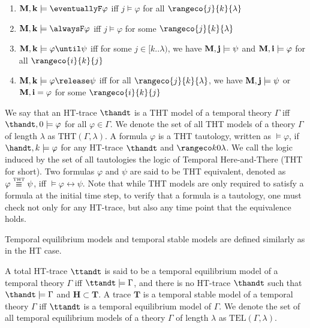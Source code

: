 \begin{definition}
\begin{enumerate}
  \item $\bf{M},k \models \eventuallyF \varphi$ iff $j \models \varphi$ for all $\rangeco{j}{k}{\lambda}$  
  \item $\bf{M},k \models \alwaysF \varphi$ iff $j \models \varphi$ for some $\rangeco{j}{k}{\lambda}$  
  \item $\bf{M}, k \models \varphi \until \psi$ iff for some $j \in[k . . \lambda)$, we have $\bf{M}, j \models \psi$ and $\bf{M}, i \models \varphi$ for all $\rangeco{i}{k}{j}$
  \item $\bf{M}, k \models \varphi \release \psi$ iff for all $\rangeco{j}{k}{\lambda}$, we have $\bf{M}, j \models \psi$ or $\bf{M},
    i=\varphi$ for some $\rangeco{i}{k}{j}$
\end{enumerate}
\end{definition}

We say that an HT-trace $\thandt$ is a THT model of a temporal theory
$\Gamma$ iff $\thandt,0 \models \varphi$ for all $\varphi \in
\Gamma$. We denote the set of all THT models of a theory $\Gamma$ of
length $\lambda$ as $\text{THT}(\Gamma,\lambda)$. A formula $\varphi$
is a THT tautology, written as $\models \varphi$, if
$\handt,k \models \varphi$ for any HT-trace $\thandt$ and
$\kinlambda$. We call the logic induced by the set of all tautologies
the logic of Temporal Here-and-There (THT for short). Two formulas
$\varphi$ and $\psi$ are said to be THT equivalent, denoted as
$\varphi \stackrel{\normalfont\mbox{\tiny THT}}{\equiv} \psi$, iff $\models \varphi \leftrightarrow
\psi$. Note that while THT models are only required to satisfy a
formula at the initial time step, to verify that a formula is a
tautology, one must check not only for any HT-trace, but also any time
point that the equivalence holds.

Temporal equilibrium models and temporal stable models are defined
similarly as in the HT case.

\begin{definition}
  A total HT-trace $\ttandt$ is said to be a temporal equilibrium
  model of a temporal theory $\Gamma$ iff $\ttandt \models \Gamma$,
  and there is no HT-trace $\thandt$ such that
  $\thandt \models \Gamma$ and $\bm{H} \subset \bm{T}$. A trace
  $\bm{T}$ is a temporal stable model of a temporal theory $\Gamma$
  iff $\ttandt$ is a temporal equilibrium model of $\Gamma$. We denote
  the set of all temporal equilibrium models of a theory $\Gamma$ of length $\lambda$
  as $\text{TEL}(\Gamma,\lambda)$.
\end{definition}

